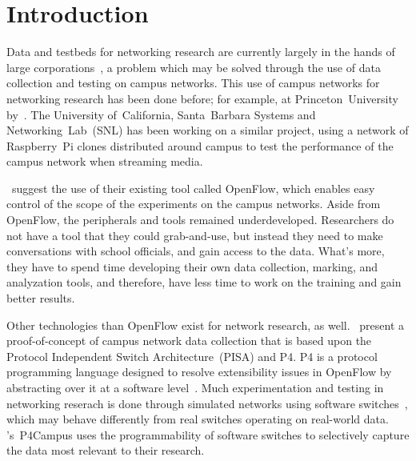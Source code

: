\section{Introduction}\label{introduction}

    Data and testbeds for networking research are currently largely in the hands of large corporations~\autocite{GuptaArpit2019AEtD}, a problem which may be solved through the use of data collection and testing on campus networks. This use of campus networks for networking research has been done before; for example, at Princeton~University by~\textcite{KimHyojoon2021Erop}. The University of~California, Santa~Barbara Systems and Networking~Lab~(SNL) has been working on a similar project, using a network of Raspberry~Pi clones distributed around campus to test the performance of the campus network when streaming media.

    \Textcite{10.1145/1355734.1355746}~suggest the use of their existing tool called OpenFlow, which enables easy control of the scope of the experiments on the campus networks. Aside from OpenFlow, the peripherals and tools remained underdeveloped. Researchers do not have a tool that they could grab-and-use, but instead they need to make conversations with school officials, and gain access to the data. What's more, they have to spend time developing their own data collection, marking, and analyzation tools, and therefore, have less time to work on the training and gain better results.

    Other technologies than OpenFlow exist for network research, as well. \Textcite{KimHyojoon2021Erop}~present a proof-of-concept of campus network data collection that is based upon the Protocol Independent Switch Architecture~(PISA) and P4.
    P4 is a protocol programming language designed to resolve extensibility issues in OpenFlow by abstracting over it at a software level~\autocite{BosshartPat2014Pppp}. Much experimentation and testing in networking reserach is done through simulated networks using software switches~\autocite{KimHyojoon2021Erop}, which may behave differently from real switches operating on real-world data. \Textcite*{KimHyojoon2021Erop}'s~P4Campus uses the programmability of software switches to selectively capture the data most relevant to their research.
